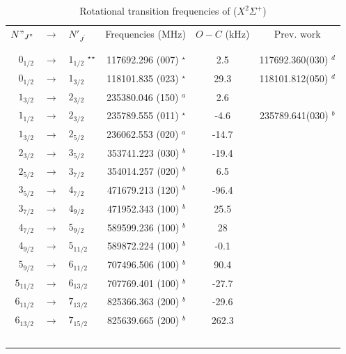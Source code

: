 \begin{table}[!htb]
    \centering
    \caption{Rotational transition frequencies of \co ($X^2\Sigma^+$)}
    
    \begin{tabular}{rclrcc}
        $N"_{J"}$ & $\xrightarrow{}$ & $N'_{J^{'}}$ & Frequencies (MHz) & $O-C$ (kHz) & Prev. work\\ 
        \\\hline \hline \\
        $0_{1/2}  $ & $\xrightarrow{}$ & $1_{1/2}$  $^\star$$^\star$     &  117692.296 (007)  $^\star$    &   2.5   & 117692.360(030) $^d$ \\
        $0_{1/2}  $ & $\xrightarrow{}$ & $1_{3/2}$       &  118101.835 (023)  $^\star$    & 29.3 & 118101.812(050) $^d$ \\
        $1_{3/2}  $ & $\xrightarrow{}$ & $2_{3/2}$       &  235380.046 (150) $^a$         & 2.6 & \\
        $1_{1/2}  $ & $\xrightarrow{}$ & $2_{3/2}$       &  235789.555 (011)  $^\star$    & -4.6 & 235789.641(030) $^b$ \\
        $1_{3/2}  $ & $\xrightarrow{}$ & $2_{5/2}$       &  236062.553 (020)  $^a$        & -14.7 &  \\
        $2_{3/2}  $ & $\xrightarrow{}$ & $3_{5/2}$       &  353741.223 (030)  $^b$        & -19.4 &  \\
        $2_{5/2}  $ & $\xrightarrow{}$ & $3_{7/2}$       &  354014.257 (020)  $^b$        & 6.5 &  \\
        $3_{5/2}  $ & $\xrightarrow{}$ & $4_{7/2}$       &  471679.213 (120) $^b$         & -96.4 &  \\
        $3_{7/2}  $ & $\xrightarrow{}$ & $4_{9/2}$       &  471952.343 (100) $^b$         & 25.5 &  \\
        $4_{7/2}  $ & $\xrightarrow{}$ & $5_{9/2}$       &  589599.236 (100) $^b$         & 28 &  \\
        $4_{9/2}  $ & $\xrightarrow{}$ & $5_{11/2}$      &  589872.224 (100) $^b$         & -0.1 &  \\
        $5_{9/2 } $ & $\xrightarrow{}$ & $6_{11/2}$      &  707496.506 (100) $^b$         & 90.4 &  \\
        $5_{11/2} $ & $\xrightarrow{}$ & $6_{13/2}$      &  707769.401 (100) $^b$         & -27.7 &  \\
        $6_{11/2} $ & $\xrightarrow{}$ & $7_{13/2}$      &  825366.363 (200) $^b$         & -29.6 &  \\
        $6_{13/2} $ & $\xrightarrow{}$ & $7_{15/2}$      &  825639.665 (200) $^b$         & 262.3 &  \\
$$
\end{tabular}
\end{table}
